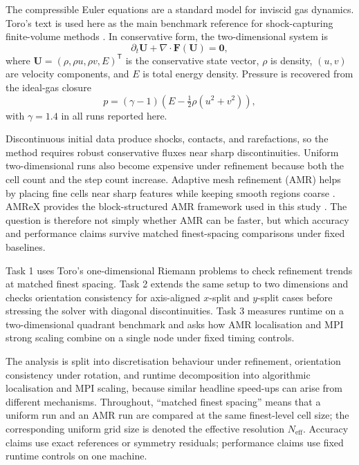 \documentclass[final,3p,times,twocolumn]{elsarticle}
\begin{document}
The compressible Euler equations are a standard model for inviscid gas dynamics. Toro's text is used here as the main benchmark reference for shock-capturing finite-volume methods \cite{toro2009}. In conservative form, the two-dimensional system is
\begin{equation}
\partial_t \mathbf{U} + \nabla\cdot\mathbf{F}(\mathbf{U})=\mathbf{0},
\end{equation}
where $\mathbf{U}=(\rho,\rho u,\rho v,E)^\mathsf{T}$ is the conservative state vector, $\rho$ is density, $(u,v)$ are velocity components, and $E$ is total energy density. Pressure is recovered from the ideal-gas closure
\begin{equation}
p=(\gamma-1)\left(E-\tfrac{1}{2}\rho(u^2+v^2)\right),
\end{equation}
with $\gamma=1.4$ in all runs reported here.

Discontinuous initial data produce shocks, contacts, and rarefactions, so the method requires robust conservative fluxes near sharp discontinuities. Uniform two-dimensional runs also become expensive under refinement because both the cell count and the step count increase. Adaptive mesh refinement (AMR) helps by placing fine cells near sharp features while keeping smooth regions coarse \cite{berger1989}. AMReX provides the block-structured AMR framework used in this study \cite{AMReX_JOSS,AMReX_IJHPCA1,amrexdocs}. The question is therefore not simply whether AMR can be faster, but which accuracy and performance claims survive matched finest-spacing comparisons under fixed baselines.

Task 1 uses Toro's one-dimensional Riemann problems to check refinement trends at matched finest spacing. Task 2 extends the same setup to two dimensions and checks orientation consistency for axis-aligned $x$-split and $y$-split cases before stressing the solver with diagonal discontinuities. Task 3 measures runtime on a two-dimensional quadrant benchmark and asks how AMR localisation and MPI strong scaling combine on a single node under fixed timing controls.

The analysis is split into discretisation behaviour under refinement, orientation consistency under rotation, and runtime decomposition into algorithmic localisation and MPI scaling, because similar headline speed-ups can arise from different mechanisms. Throughout, ``matched finest spacing'' means that a uniform run and an AMR run are compared at the same finest-level cell size; the corresponding uniform grid size is denoted the effective resolution $N_\mathrm{eff}$. Accuracy claims use exact references or symmetry residuals; performance claims use fixed runtime controls on one machine.
\end{document}
